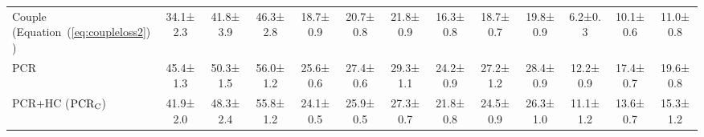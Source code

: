 \begin{table}[t]
\begin{tabular}{l|ccc|ccc|ccc|ccc}
Couple (Equation~(\ref{eq:coupleloss2})) & 34.1\scriptsize±2.3& 41.8\scriptsize±3.9                 & 46.3\scriptsize±2.8                 & 18.7\scriptsize±0.9                  & 20.7\scriptsize±0.8                  & 21.8\scriptsize±0.9 & 16.3\scriptsize±0.8                   & 18.7\scriptsize±0.7                  & 19.8\scriptsize±0.9                  & 6.2\scriptsize±0.3                  & 10.1\scriptsize±0.6                  & 11.0\scriptsize±0.8\\
PCR    & 45.4\scriptsize±1.3& 50.3\scriptsize±1.5                & 56.0\scriptsize±1.2                 & 25.6\scriptsize±0.6                &27.4\scriptsize±0.6                 & 29.3\scriptsize±1.1 & 24.2\scriptsize±0.9                   & 27.2\scriptsize±1.2                  & 28.4\scriptsize±0.9                   & 12.2\scriptsize±0.9                   & 17.4\scriptsize±0.7                  & 19.6\scriptsize±0.8\\\hline

PCR+HC ($\rm PCR_C$)    & 41.9\scriptsize±2.0& 48.3\scriptsize±2.4                & 55.8\scriptsize±1.2                 & 24.1\scriptsize±0.5           & 25.9\scriptsize±0.5          & 27.3\scriptsize±0.7 & 21.8\scriptsize±0.8                   & 24.5\scriptsize±0.9                  & 26.3\scriptsize±1.0                   & {11.1\scriptsize±1.2}                   & {13.6\scriptsize±0.7}                  & {15.3\scriptsize±1.2}\\


\end{tabular}
\end{table}
